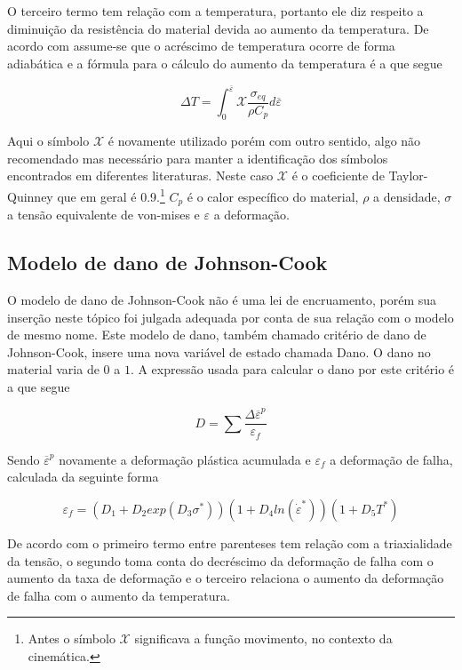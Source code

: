 O terceiro termo tem relação com a temperatura, portanto ele diz respeito a diminuição da resistência do material devida ao aumento da temperatura. De acordo com \cite{Crouch} assume-se que o acréscimo de temperatura ocorre de forma adiabática e a fórmula para o cálculo do aumento da temperatura é a que segue

\begin{equation}
    \Delta T = \int_0^{\overline{\varepsilon}} \mathcal{X} \frac{\sigma_{eq}}{\rho C_p} d\overline{\varepsilon}
\end{equation}

Aqui o símbolo $ \mathcal{X}$ é novamente utilizado porém com outro sentido, algo não recomendado mas necessário para manter a identificação dos símbolos encontrados em diferentes literaturas. Neste caso $ \mathcal{X} $ é o coeficiente de Taylor-Quinney que em geral é 0.9.\footnote{Antes o símbolo $\mathcal{X}$ significava a função movimento, no contexto da cinemática.} $C_p$ é o calor específico do material, $ \rho $ a densidade, $ \sigma $ a tensão equivalente de von-mises e $ \varepsilon$ a deformação. 

\subsection{Modelo de dano de Johnson-Cook}

O modelo de dano de Johnson-Cook não é uma lei de encruamento, porém sua inserção neste tópico foi julgada adequada por conta de sua relação com o modelo de mesmo nome.
Este modelo de dano, também chamado critério de dano de Johnson-Cook, insere uma nova variável de estado chamada Dano. O dano no material varia de $ 0 $ a $ 1 $. A expressão usada para calcular o dano por este critério é a que segue

\begin{equation} \label{eq:danoincrJC}
    D = \sum \frac{\Delta \overline{\varepsilon}^p}{\varepsilon_f}
\end{equation}

Sendo $ \overline{\varepsilon}^p $ novamente a deformação plástica acumulada e $ \varepsilon_f $ a deformação de falha, calculada da seguinte forma

\begin{equation}
    \varepsilon_f = (D_1 + D_2 exp(D_3 \sigma^*))(1 + D_4 ln(\dot{\varepsilon}^*))(1 + D_5 T^*)
\end{equation}

De acordo com \cite{Crouch} o primeiro termo entre parenteses tem relação com a triaxialidade da tensão, o segundo toma conta do decréscimo da deformação de falha com o aumento da taxa de deformação e o terceiro relaciona o aumento da deformação de falha com o aumento da temperatura. \\

